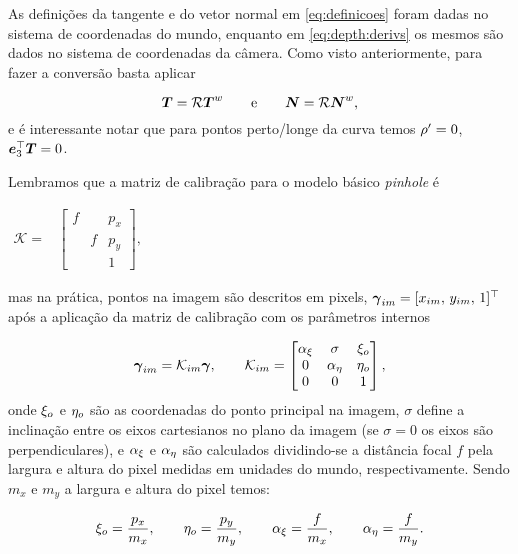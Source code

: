 As definições da tangente e do vetor normal em \ref{eq:definicoes} foram dadas no sistema de coordenadas do mundo, enquanto em \ref{eq:depth:derivs} os mesmos são dados no sistema de coordenadas da câmera. Como visto anteriormente, para fazer a conversão basta aplicar 

\begin{equation*}
\boldsymbol{T} = \mathcal{R}\boldsymbol{T}^w \qquad \text{e} \qquad \boldsymbol{N} = \mathcal{R}\boldsymbol{N}^w,
\end{equation*}
e é interessante notar que para pontos perto/longe da curva temos $\rho' = 0$, $\boldsymbol{e}_3^\top\boldsymbol{T} = 0$.


Lembramos que a matriz de calibração para o modelo básico \textit{pinhole} é

\begin{center}
$
\begin{array}{cc}
\mathcal K = & \begin{bmatrix}
               f& &p_x\\
                &f&p_y\\
                & &1
               \end{bmatrix}, 
\end{array}
$
\end{center}
mas na prática, pontos na imagem são descritos em pixels, $\boldsymbol{\gamma}_{im} = [x_{im},\, y_{im},\, 1]^\top$ após a aplicação da matriz de calibração com os parâmetros internos 

\begin{equation}\label{eq:intrinsic:parameter:transf}
\boldsymbol{\gamma}_{im} = \mathcal K_{im}\boldsymbol{\gamma},
\ \ \ \ \ \
\mathcal K_{im} = \begin{bmatrix}
\alpha_\xi & \sigma & \xi_o\\
0 &\alpha_\eta &  \eta_o\\
0 & 0 &  1
\end{bmatrix},
\end{equation}
onde $\xi_o$ e $\eta_o$ são as coordenadas do ponto principal na imagem, $\sigma$ define a inclinação entre os eixos cartesianos no plano da imagem (se $\sigma=0$ os eixos são perpendiculares), e
$\alpha_\xi$ e $\alpha_\eta$ são calculados dividindo-se a distância focal $f$ pela largura e altura do pixel medidas em unidades do mundo, respectivamente. Sendo $m_x$ e $m_y$ a largura e altura do pixel temos:

\begin{equation*}
\xi_o = \frac{p_x}{m_x}, \qquad \eta_o = \frac{p_y}{m_y}, \qquad \alpha_\xi = \frac{f}{m_x}, \qquad \alpha_\eta = \frac{f}{m_y}.
\end{equation*}



